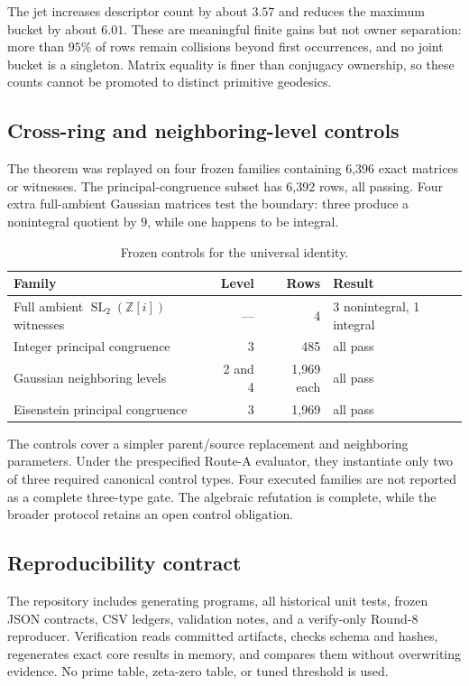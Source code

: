 \documentclass[11pt,a4paper]{article}
\theoremstyle{definition}
\theoremstyle{remark}
\newcommand{\SL}{\operatorname{SL}}
\newcommand{\Gauss}{\mathbb{Z}[i]}
\begin{document}
The jet increases descriptor count by about \(3.57\) and reduces the maximum bucket by about \(6.01\). These are meaningful finite gains but not owner separation: more than \(95\%\) of rows remain collisions beyond first occurrences, and no joint bucket is a singleton. Matrix equality is finer than conjugacy ownership, so these counts cannot be promoted to distinct primitive geodesics.

\subsection{Cross-ring and neighboring-level controls}

The theorem was replayed on four frozen families containing 6,396 exact matrices or witnesses. The principal-congruence subset has 6,392 rows, all passing. Four extra full-ambient Gaussian matrices test the boundary: three produce a nonintegral quotient by \(9\), while one happens to be integral.

\begin{table}[t]
\centering
\caption{Frozen controls for the universal identity.}
\label{tab:controls}
\begin{tabular}{lrrl}
\toprule
Family & Level & Rows & Result \\
\midrule
Full ambient \(\SL_2(\Gauss)\) witnesses & --- & 4 & 3 nonintegral, 1 integral \\
Integer principal congruence & 3 & 485 & all pass \\
Gaussian neighboring levels & 2 and 4 & 1,969 each & all pass \\
Eisenstein principal congruence & 3 & 1,969 & all pass \\
\bottomrule
\end{tabular}
\end{table}

The controls cover a simpler parent/source replacement and neighboring parameters. Under the prespecified Route-A evaluator, they instantiate only two of three required canonical control types. Four executed families are not reported as a complete three-type gate. The algebraic refutation is complete, while the broader protocol retains an open control obligation.

\subsection{Reproducibility contract}

The repository includes generating programs, all historical unit tests, frozen JSON contracts, CSV ledgers, validation notes, and a verify-only Round-8 reproducer. Verification reads committed artifacts, checks schema and hashes, regenerates exact core results in memory, and compares them without overwriting evidence. No prime table, zeta-zero table, or tuned threshold is used.
\end{document}
